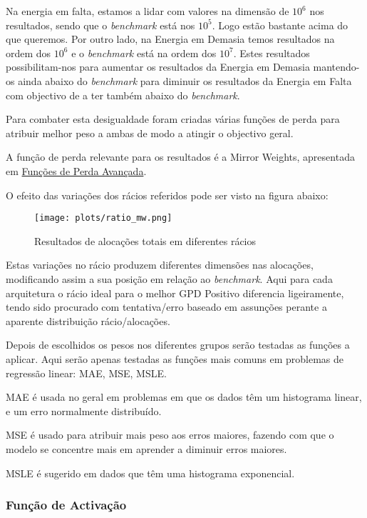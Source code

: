 Na energia em falta, estamos a lidar com valores na dimensão de $10^{6}$ nos resultados, sendo que o \textit{benchmark} está nos $10^{5}$. Logo estão bastante acima do que queremos. Por outro lado, na Energia em Demasia temos resultados na ordem dos $10^{6}$ e o \textit{benchmark} está na ordem dos $10^{7}$. Estes resultados possibilitam-nos para aumentar os resultados da Energia em Demasia mantendo-os ainda abaixo do \textit{benchmark} para diminuir os resultados da Energia em Falta com objectivo de a ter também abaixo do \textit{benchmark}.\par
Para combater esta desigualdade foram criadas várias funções de perda para atribuir melhor peso a ambas de modo a atingir o objectivo geral.\par
A função de perda relevante para os resultados é a Mirror Weights, apresentada em \hyperref[advanced_loss_expl]{Funções de Perda Avançada}.\par
O efeito das variações dos rácios referidos pode ser visto na figura abaixo:

\begin{figure}[H]
  \centering
  \texttt{[image: plots/ratio\_mw.png]}
  \caption{Resultados de alocações totais em diferentes rácios}
  \label{fig:resexpratiomw}
\end{figure}

Estas variações no rácio produzem diferentes dimensões nas alocações, modificando assim a sua posição em relação ao \textit{benchmark}. Aqui para cada arquitetura o rácio ideal para o melhor GPD Positivo diferencia ligeiramente, tendo sido procurado com tentativa/erro baseado em assunções perante a aparente distribuição rácio/alocações.\par


Depois de escolhidos os pesos nos diferentes grupos serão testadas as funções a aplicar. Aqui serão apenas testadas as funções mais comuns em problemas de regressão linear: \gls{MAE}, \gls{MSE}, \gls{MSLE}.\par
\gls{MAE} é usada no geral em problemas em que os dados têm um histograma linear, e um erro normalmente distribuído.\par
\gls{MSE} é usado para atribuir mais peso aos erros maiores, fazendo com que o modelo se concentre mais em aprender a diminuir erros maiores.\par
\gls{MSLE} é sugerido em dados que têm uma histograma exponencial.\par


\subsubsection{Função de Activação}

